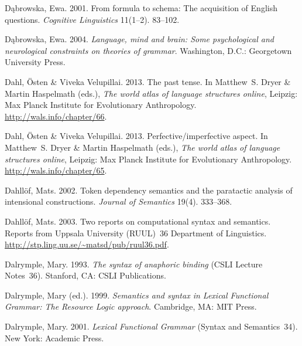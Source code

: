 \begin{thebibliography}{1420}
D{\k{a}}browska, Ewa. 2001.
\newblock From formula to schema: {The} acquisition of {English} questions.
\newblock \emph{Cognitive Linguistics} 11(1--2). 83--102.

D{\k{a}}browska, Ewa. 2004.
\newblock \emph{Language, mind and brain: {Some} psychological and neurological
  constraints on theories of grammar}.
\newblock Washington, D.C.: Georgetown University Press.

Dahl, {\"O}sten \& Viveka Velupillai. 2013{}.
\newblock The past tense.
\newblock In Matthew~S. Dryer \& Martin Haspelmath (eds.), \emph{The world
  atlas of language structures online}, Leipzig: Max Planck Institute for
  Evolutionary Anthropology.
\newblock \urlprefix\url{http://wals.info/chapter/66}.

Dahl, {\"O}sten \& Viveka Velupillai. 2013{}.
\newblock Perfective/imperfective aspect.
\newblock In Matthew~S. Dryer \& Martin Haspelmath (eds.), \emph{The world
  atlas of language structures online}, Leipzig: Max Planck Institute for
  Evolutionary Anthropology.
\newblock \urlprefix\url{http://wals.info/chapter/65}.

Dahll{\"o}f, Mats. 2002.
\newblock Token dependency semantics and the paratactic analysis of intensional
  constructions.
\newblock \emph{Journal of Semantics} 19(4). 333--368.

Dahll{\"o}f, Mats. 2003.
\newblock Two reports on computational syntax and semantics.
\newblock Reports from Uppsala University (RUUL)~36 Department of Linguistics.
\newblock \urlprefix\url{http://stp.ling.uu.se/~matsd/pub/ruul36.pdf}.

Dalrymple, Mary. 1993.
\newblock \emph{The syntax of anaphoric binding} (CSLI Lecture Notes~36).
\newblock Stanford, CA: CSLI Publications.

Dalrymple, Mary (ed.). 1999.
\newblock \emph{Semantics and syntax in {Lexical Functional Grammar}: {The}
  {Resource Logic} approach}.
\newblock Cambridge, MA: MIT Press.

Dalrymple, Mary. 2001.
\newblock \emph{{Lexical Functional Grammar}} (Syntax and Semantics~34).
\newblock New York: Academic Press.


\end{thebibliography}
